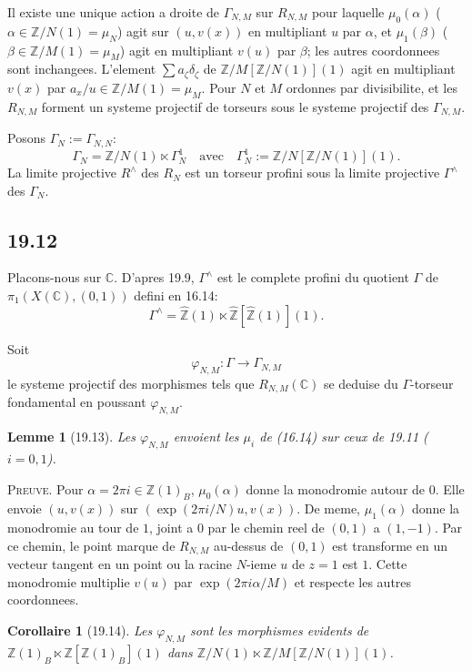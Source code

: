 \documentclass[12pt,a4paper]{article}
\theoremstyle{plain}
\newtheorem{lemma}[theorem]{Lemme}
\newtheorem{corollary}[theorem]{Corollaire}
\theoremstyle{definition}
\theoremstyle{remark}
\newcommand{\Betti}{B}
\newcommand{\ZZ}{\mathbb{Z}}
\newcommand{\CC}{\mathbb{C}}
\begin{document}
Il existe une unique action a droite de $\Gamma_{N,M}$ sur $R_{N,M}$
pour laquelle $\mu_0(\alpha)$ ($\alpha \in \ZZ/N(1) = \mu_N$) agit sur
$(u,v(x))$ en multipliant $u$ par $\alpha$, et $\mu_1(\beta)$
($\beta \in \ZZ/M(1) = \mu_M$) agit en multipliant $v(u)$ par
$\beta$; les autres coordonnees sont inchangees. L'element
$\sum a_\zeta \delta_\zeta$ de $\ZZ/M[\ZZ/N(1)](1)$ agit en
multipliant $v(x)$ par $a_x/u \in \ZZ/M(1) = \mu_M$. Pour $N$ et $M$
ordonnes par divisibilite, et les $R_{N,M}$ forment un systeme
projectif de torseurs sous le systeme projectif des $\Gamma_{N,M}$.

Posons $\Gamma_N := \Gamma_{N,N}$:
\[
\Gamma_N = \ZZ/N(1) \ltimes \Gamma_N^1 \quad \text{avec} \quad
\Gamma_N^1 := \ZZ/N[\ZZ/N(1)](1).
\]
La limite projective $R^\wedge$ des $R_N$ est un torseur profini sous
la limite projective $\Gamma^\wedge$ des $\Gamma_N$.

\subsection{19.12}

Placons-nous sur $\CC$. D'apres 19.9, $\Gamma^\wedge$ est le complete
profini du quotient $\Gamma$ de $\pi_1(X(\CC),(0,1))$ defini en 16.14:
\[
\Gamma^\wedge = \hat{\ZZ}(1) \ltimes \hat{\ZZ}[\hat{\ZZ}(1)](1).
\]

Soit
\begin{equation}\label{eq:19.12.1}
\varphi_{N,M} : \Gamma \to \Gamma_{N,M}
\end{equation}
le systeme projectif des morphismes tels que $R_{N,M}(\CC)$ se
deduise du $\Gamma$-torseur fondamental en poussant $\varphi_{N,M}$.

\begin{lemma}[19.13]\label{lem:19.13}
Les $\varphi_{N,M}$ envoient les $\mu_i$ de (16.14) sur ceux de 19.11
($i=0,1$).
\end{lemma}

\noindent \textsc{Preuve.} Pour $\alpha = 2\pi i \in \ZZ(1)_\Betti$,
$\mu_0(\alpha)$ donne la monodromie autour de $0$. Elle envoie
$(u,v(x))$ sur $(\exp(2\pi i/N)u, v(x))$. De meme, $\mu_1(\alpha)$
donne la monodromie au tour de $1$, joint a $0$ par le chemin reel de
$(0,1)$ a $(1,-1)$. Par ce chemin, le point marque de $R_{N,M}$
au-dessus de $(0,1)$ est transforme en un vecteur tangent en un point
ou la racine $N$-ieme $u$ de $z=1$ est $1$. Cette monodromie
multiplie $v(u)$ par $\exp(2\pi i\alpha/M)$ et respecte les autres
coordonnees.

\begin{corollary}[19.14]\label{cor:19.14}
Les $\varphi_{N,M}$ sont les morphismes evidents de
$\ZZ(1)_\Betti \ltimes \ZZ[\ZZ(1)_\Betti](1)$ dans
$\ZZ/N(1) \ltimes \ZZ/M[\ZZ/N(1)](1)$.
\end{corollary}
\end{document}
